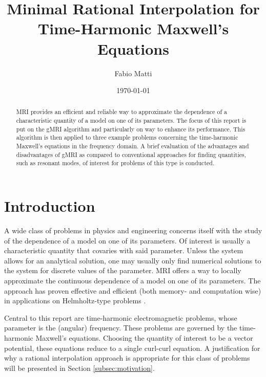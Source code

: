 \documentclass[11pt, a4paper]{article}
\title{Minimal Rational Interpolation for Time-Harmonic Maxwell's Equations}
\author{Fabio Matti}
\date{\today}
\begin{document}
\maketitle

\begin{abstract}
    \acrfull{MRI} provides an efficient and reliable way to approximate the 
    dependence of a characteristic quantity of a model on one of its parameters.
    The focus of this report is put on the \acrfull{gMRI} algorithm and particularly
    on way to enhance its performance. This algorithm is then applied to three 
    example problems concerning the time-harmonic Maxwell's equations in the 
    frequency domain. A brief evaluation of the advantages and disadvantages of
    \acrshort{gMRI} as compared to conventional approaches for finding quantities,
    such as resonant modes, of interest for problems of this type is conducted.
\end{abstract}

\newpage
\printglossary[type=\acronymtype, nonumberlist]

\newpage
\tableofcontents

\newpage
\section{Introduction}
\label{sec:introduction}

A wide class of problems in physics and engineering concerns itself with the
study of the dependence of a model on one of its parameters. 
Of interest is usually a characteristic quantity that covaries with said parameter.
Unless the system allows for an analytical solution, one may usually only
find numerical solutions to the system for discrete values of the parameter.
\acrfull{MRI} offers a way to locally approximate the continuous
dependence of a model on one of its parameters. The approach has proven
effective and efficient (both memory- and computation wise) in applications
on Helmholtz-type problems \cite{greedyMRI, shortMRI}.

Central to this report are time-harmonic electromagnetic problems, whose 
parameter is the (angular) frequency. These problems are governed by
the time-harmonic Maxwell's equations. Choosing the quantity of interest
to be a vector potential, these equations reduce to a single curl-curl equation.
A justification for why a rational interpolation approach is appropriate for
this class of problems will be presented in Section \ref{subsec:motivation}.
\end{document}
